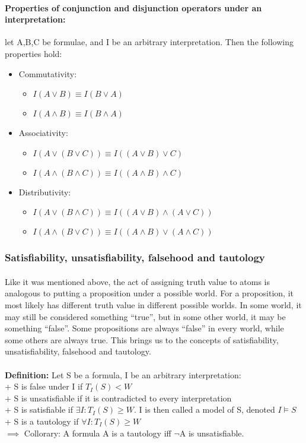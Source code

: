\documentclass[part1.tex]{subfiles}
\begin{document}
\paragraph{Properties of conjunction and disjunction operators
under an interpretation:} let A,B,C be formulae, and I be an
arbitrary interpretation. Then the following properties hold:
\begin{itemize}
\item Commutativity:
  \begin{itemize}
    \item $I(A \vee B) \equiv I(B \vee A)$
    \item $I(A \wedge B) \equiv I(B \wedge A)$
  \end{itemize}
\item Associativity:
  \begin{itemize}
    \item $I(A \vee (B \vee C)) \equiv I((A \vee B) \vee C)$
    \item $I(A \wedge (B \wedge C)) \equiv I((A \wedge B) \wedge C)$
  \end{itemize}
\item Distributivity:
  \begin{itemize}
    \item $I(A \vee (B \wedge C)) \equiv I((A \vee B) \wedge (A \vee
      C))$
    \item $I(A \wedge (B \vee C)) \equiv I((A \wedge B) \vee (A \wedge
      C))$
  \end{itemize}
\end{itemize}
\subsubsection{Satisfiability, unsatisfiability, falsehood and
tautology}
\paragraph{} Like it was mentioned above, the act of assigning
truth value to atoms is analogous to putting a proposition under
a possible world. For a proposition, it most likely has different truth
value in different possible worlds. In some world, it may still
be considered something ``true'', but in some other world, it
may be something ``false''. Some propositions are always
``false'' in every world, while some others are always true.
This brings us to the concepts of
satisfiability, unsatisfiability, falsehood and tautology.\\\\
{\bfseries Definition:} Let S be a formula, I be an arbitrary interpretation:\\
\indent + S is false under I if \(T_I(S) < W\)\\
\indent + S is unsatisfiable if it is contradicted to every interpretation\\ 
\indent + S is satisfiable if \(\exists I: T_I(S) \ge W\). I is then called a model of S, denoted \(I \models S\)\\
\indent + S is a tautology if \(\forall I: T_I(S) \ge W\)\\
\indent \(\implies\) Collorary: A formula A is a tautology iff \(\neg\)A is unsatisfiable.
\end{document}
